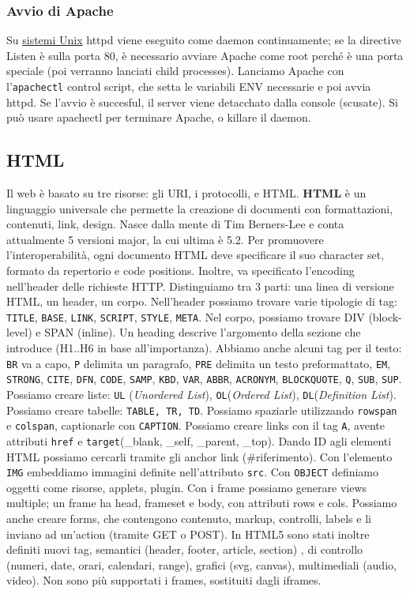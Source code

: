 \documentclass[11pt]{article}
\newcommand{\code}[1]{\texttt{#1}}
\begin{document}
\subsubsection{Avvio di Apache}
Su \href{https://www.youtube.com/watch?v=dFUlAQZB9Ng}{sistemi Unix} httpd viene eseguito come daemon continuamente; se la directive Listen è sulla porta 80, è necessario avviare Apache come root perché è una porta speciale (poi verranno lanciati child processes). Lanciamo Apache con l'\code{apachectl} control script, che setta le variabili ENV necessarie e poi avvia httpd. Se l'avvio è succesful, il server viene detacchato dalla console (scusate). Si può usare apachectl per terminare Apache, o killare il daemon.
\subsection{HTML}
Il web è basato su tre risorse: gli URI, i protocolli, e HTML. \textbf{HTML} è un linguaggio universale che permette la creazione di documenti con formattazioni, contenuti, link, design. Nasce dalla mente di Tim Berners-Lee e conta attualmente 5 versioni major, la cui ultima è 5.2. Per promuovere l'interoperabilità, ogni documento HTML deve specificare il suo character set, formato da repertorio e code positions. Inoltre, va specificato l'encoding nell'header delle richieste HTTP. Distinguiamo tra 3 parti: una linea di versione HTML, un header, un corpo. Nell'header possiamo trovare varie tipologie di tag: \code{TITLE}, \code{BASE}, \code{LINK}, \code{SCRIPT}, \code{STYLE}, \code{META}. Nel corpo, possiamo trovare DIV (block-level) e SPAN (inline). Un heading descrive l'argomento della sezione che introduce (H1..H6 in base all'importanza). Abbiamo anche alcuni tag per il testo: \code{BR} va a capo, \code{P} delimita un paragrafo, \code{PRE} delimita un testo preformattato, \code{EM}, \code{STRONG}, \code{CITE}, \code{DFN}, \code{CODE}, \code{SAMP}, \code{KBD}, \code{VAR}, \code{ABBR}, \code{ACRONYM}, \code{BLOCKQUOTE}, \code{Q}, \code{SUB}, \code{SUP}. Possiamo creare liste: \code{UL} (\textit{Unordered List}), \code{OL}(\textit{Ordered List}), \code{DL}(\textit{Definition List}). Possiamo creare tabelle: \code{TABLE, TR, TD}. Possiamo spaziarle utilizzando \code{rowspan} e \code{colspan}, captionarle con \code{CAPTION}. Possiamo creare links con il tag \code{A}, avente attributi \code{href} e \code{target}(\_blank, \_self, \_parent, \_top). Dando ID agli elementi HTML possiamo cercarli tramite gli anchor link (\#riferimento). Con l'elemento \code{IMG} embeddiamo immagini definite nell'attributo \code{src}. Con \code{OBJECT} definiamo oggetti come risorse, applets, plugin. Con i frame possiamo generare views multiple; un frame ha head, frameset e body, con attributi rows e cols. Possiamo anche creare forms, che contengono contenuto, markup, controlli, labels e li inviano ad un'action (tramite GET o POST). In HTML5 sono stati inoltre definiti nuovi tag, semantici (header, footer, article, section) , di controllo (numeri, date, orari, calendari, range), grafici (svg, canvas), multimediali (audio, video). Non sono più supportati i frames, sostituiti dagli iframes.
\end{document}
